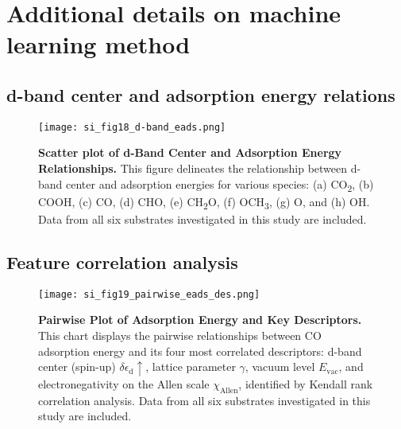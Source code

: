 
\section{Additional details on machine learning method}

\subsection{d-band center and adsorption energy relations}
\label{si_sec3.1_dband_eads}

\begin{figure}
  \centering
  \texttt{[image: si\_fig18\_d-band\_eads.png]}
  \caption{\textbf{Scatter plot of d-Band Center and Adsorption Energy Relationships.}
  This figure delineates the relationship between d-band center and adsorption energies for
  various species: (a) CO\textsubscript{2}, (b) COOH, (c) CO, (d) CHO,
  (e) CH\textsubscript{2}O, (f) OCH\textsubscript{3}, (g) O, and (h) OH.
  Data from all six substrates investigated in this study are included.}
  \label{si_fig18:dband_vs_eads}
\end{figure}

\subsection{Feature correlation analysis}
\label{si_sec3.2_feature_corr}

\begin{figure}
  \centering
  \texttt{[image: si\_fig19\_pairwise\_eads\_des.png]}
  \caption{\textbf{Pairwise Plot of Adsorption Energy and Key Descriptors.}
  This chart displays the pairwise relationships between CO adsorption energy and
  its four most correlated descriptors: d-band center (spin-up) $\delta\epsilon_{\text{d}}\uparrow$,
  lattice parameter $\gamma$, vacuum level $E_\text{vac}$, and electronegativity
  on the Allen scale $\chi_\text{Allen}$, identified by Kendall rank correlation analysis.
  Data from all six substrates investigated in this study are included.}
  \label{si_fig19:pairwise_eads_des}
\end{figure}

